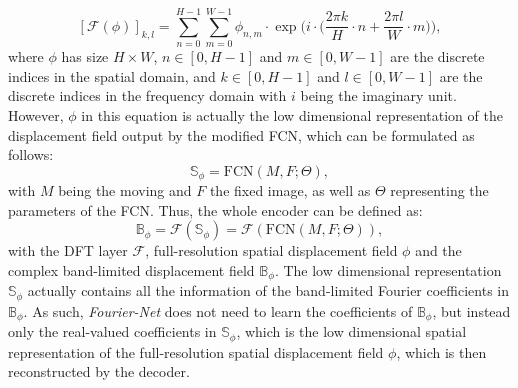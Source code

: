 \documentclass[english,version-2022-01]{uzl-thesis} %
\begin{document}
\begin{equation} \label{eq:DFT}
	[\mathcal{F}(\phi)]_{k,l} = \sum^{H-1}_{n=0} \sum^{W-1}_{m=0} \phi_{n,m} \cdot \exp \Bigg(i \cdot \bigg(\frac{2 \pi k}{H} \cdot n + \frac{2 \pi l}{W} \cdot m \bigg) \Big),
\end{equation}
where $\phi$ has size $H \times W$, $n \in [0,H-1]$ and $m \in [0,W-1]$ are the discrete indices in the spatial domain, and $k \in [0,H-1]$ and $l \in [0,W-1]$ are the discrete indices in the frequency domain with $i$ being the imaginary unit. However, $\phi$ in this equation is actually the low dimensional representation of the displacement field output by the modified FCN, which can be formulated as follows:
\begin{equation} \label{eq:FCN}
	\mathbb{S}_\phi = \text{FCN}(M,F;\Theta),
\end{equation}
with $M$ being the moving and $F$ the fixed image, as well as $\Theta$ representing the parameters of the FCN. Thus, the whole encoder can be defined 
as:
\begin{equation}\label{eq:encoder}
	\mathbb{B}_\phi = \mathcal{F}(\mathbb{S}_\phi) = \mathcal{F}(\text{FCN}(M,F;\Theta)),
\end{equation}
with the DFT layer $\mathcal{F}$, full-resolution spatial displacement field $\phi$ and the complex band-limited displacement field $\mathbb{B}_\phi$. The low dimensional representation $\mathbb{S}_\phi$ actually contains all the information of the band-limited Fourier coefficients in $\mathbb{B}_\phi$. As such, \emph{Fourier-Net} does not need to learn the coefficients of $\mathbb{B}_\phi$, but instead only the real-valued coefficients in $\mathbb{S}_\phi$, which is the low dimensional spatial representation of the full-resolution spatial displacement field $\phi$, which is then reconstructed by the decoder. 
\end{document}

